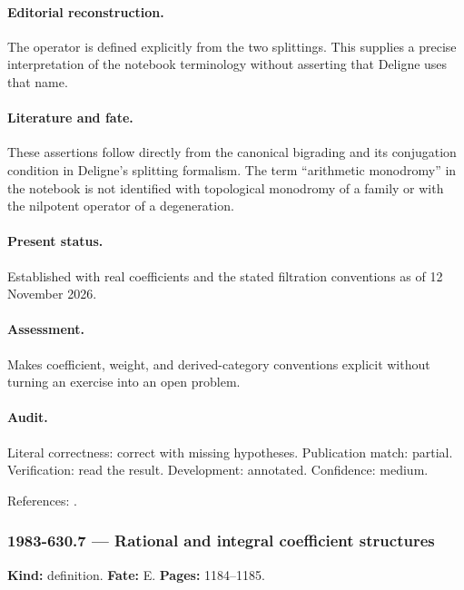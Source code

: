 \paragraph{Editorial reconstruction.} The operator is defined explicitly from the two splittings. This supplies a precise interpretation of the notebook terminology without asserting that Deligne uses that name.

\paragraph{Literature and fate.} These assertions follow directly from the canonical bigrading and its conjugation condition in Deligne’s splitting formalism. The term “arithmetic monodromy” in the notebook is not identified with topological monodromy of a family or with the nilpotent operator of a degeneration.

\paragraph{Present status.} Established with real coefficients and the stated filtration conventions as of 12 November 2026.

\paragraph{Assessment.} Makes coefficient, weight, and derived-category conventions explicit without turning an exercise into an open problem.

\paragraph{Audit.} Literal correctness: correct with missing hypotheses. Publication match: partial. Verification: read the result. Development: annotated. Confidence: medium.

\noindent References: \citep{deligne1971hodge}.\par

\subsubsection{1983-630.7 --- Rational and integral coefficient structures}

\label{item:1983-630.7}

\noindent\textbf{Kind:} definition. \textbf{Fate:} E. \textbf{Pages:} 1184--1185.\par

